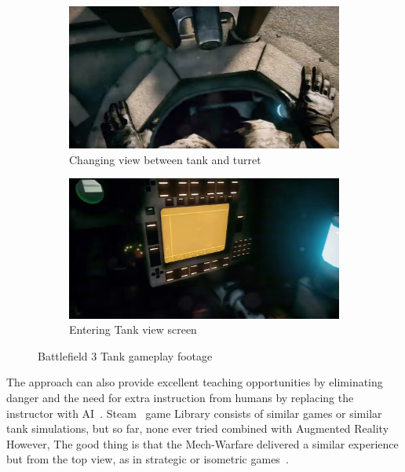 \begin{figure}[H]
	\centering
	\begin{subfigure}[b]{0.4\textwidth}
		\includegraphics[width=\linewidth]{background/fig/BF3-1.png}
		\caption{Changing view between tank and turret}
		\label{fig:inside}
	\end{subfigure}
	\begin{subfigure}[b]{0.4\textwidth}
		\includegraphics[width=\linewidth]{background/fig/BF3-2.png}
		\caption{Entering Tank view screen}
		\label{fig:tank}
	\end{subfigure}
	\caption{Battlefield 3 Tank gameplay footage}\label{fig:BF3}
\end{figure}
The approach can also provide excellent teaching opportunities by eliminating danger and the need for extra instruction from humans by replacing the instructor with AI~\cite{abishur_prakash_augmented_2018}.
Steam~\cite{steam_workshop_tanks_2018} game Library consists of similar games or similar tank simulations, but so far, none ever tried combined with Augmented Reality\\[1pt]
However, The good thing is that the Mech-Warfare delivered a similar experience but from the top view, as in strategic or isometric games~\cite{mech-warfare_mech-warfare_2015}.
